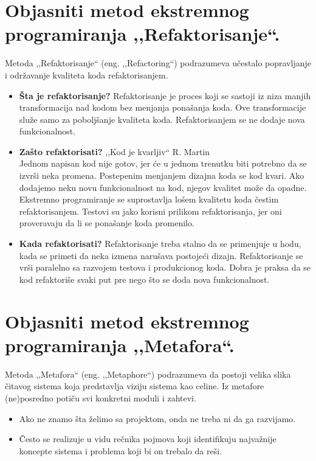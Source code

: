 \documentclass[a4paper]{article}
\begin{document}
\section{Objasniti metod ekstremnog programiranja ,,Refaktorisanje``.}
  Metoda ,,Refaktorisanje`` (eng. ,,Refactoring``) podrazumeva učestalo popravljanje i održavanje
  kvaliteta koda refaktorisanjem. 
  \begin{itemize}
    \item \textbf{Šta je refaktorisanje?} Refaktorisanje je proces koji se sastoji iz niza
          manjih transformacija nad kodom bez menjanja ponašanja koda. Ove transformacije
          služe samo za poboljšanje kvaliteta koda. Refaktorisanjem se ne dodaje nova funkcionalnost.
    \item \textbf{Zašto refaktorisati?} ,,Kod je kvarljiv`` R. Martin\\
          Jednom napisan kod nije gotov, jer će u jednom trenutku biti potrebno da se izvrši
          neka promena. Postepenim menjanjem dizajna koda se kod kvari. Ako dodajemo
          neku novu funkcionalnost na kod, njegov kvalitet može da opadne. Ekstremno
          programiranje se suprostavlja lošem kvalitetu koda čestim refaktorisanjem.
          Testovi su jako korisni prilikom refaktorisanja, jer oni proveravaju da li se
          ponašanje koda promenilo.
    \item \textbf{Kada refaktorisati?} Refaktorisanje treba stalno da se primenjuje u hodu,
          kada se primeti da neka izmena narušava postojeći dizajn. Refaktorisanje se 
          vrši paralelno sa razvojem testova i produkcionog koda. Dobra je praksa da se 
          kod refaktoriše svaki put pre nego što se doda nova funkcionalnost. 
  \end{itemize}

\section{Objasniti metod ekstremnog programiranja ,,Metafora``.}
  Metoda ,,Metafora`` (eng. ,,Metaphore``) podrazumeva da postoji velika slika čitavog sistema
  koja predstavlja viziju sistema kao celine. Iz metafore (ne)posredno potiču svi konkretni moduli
  i zahtevi. \\
  \begin{itemize}
    \item Ako ne znamo šta želimo sa projektom, onda ne treba ni da ga razvijamo. \\
    \item Često se realizuje u vidu rečnika pojmova koji identifikuju najvažnije koncepte sistema 
          i problema koji bi on trebalo da reši.
  \end{itemize}
\end{document}
